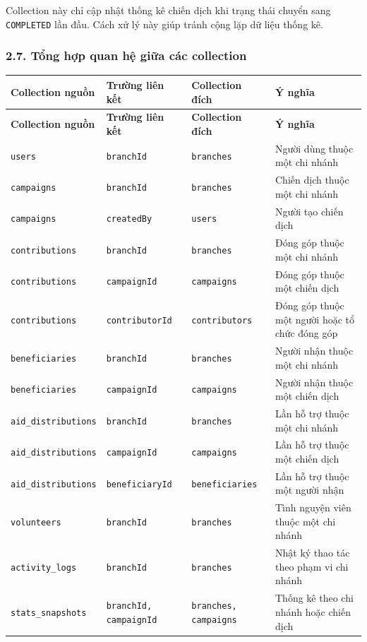 \documentclass[12pt,a4paper]{article}
\begin{document}
Collection này chỉ cập nhật thống kê chiến dịch khi trạng thái chuyển sang \texttt{COMPLETED} lần đầu. Cách xử lý này giúp tránh cộng lặp dữ liệu thống kê.

\subsubsection*{2.7. Tổng hợp quan hệ giữa các collection}

\begin{center}
\small
\begin{longtable}{|p{3.3cm}|p{2.6cm}|p{2.9cm}|p{4cm}|}
\hline
\textbf{Collection nguồn} & \textbf{Trường liên kết} & \textbf{Collection đích} & \textbf{Ý nghĩa} \\ \hline
\endfirsthead
\hline
\textbf{Collection nguồn} & \textbf{Trường liên kết} & \textbf{Collection đích} & \textbf{Ý nghĩa} \\ \hline
\endhead
\texttt{users} & \texttt{branchId} & \texttt{branches} & Người dùng thuộc một chi nhánh \\ \hline
\texttt{campaigns} & \texttt{branchId} & \texttt{branches} & Chiến dịch thuộc một chi nhánh \\ \hline
\texttt{campaigns} & \texttt{createdBy} & \texttt{users} & Người tạo chiến dịch \\ \hline
\texttt{contributions} & \texttt{branchId} & \texttt{branches} & Đóng góp thuộc một chi nhánh \\ \hline
\texttt{contributions} & \texttt{campaignId} & \texttt{campaigns} & Đóng góp thuộc một chiến dịch \\ \hline
\texttt{contributions} & \texttt{contributorId} & \texttt{contributors} & Đóng góp thuộc một người hoặc tổ chức đóng góp \\ \hline
\texttt{beneficiaries} & \texttt{branchId} & \texttt{branches} & Người nhận thuộc một chi nhánh \\ \hline
\texttt{beneficiaries} & \texttt{campaignId} & \texttt{campaigns} & Người nhận thuộc một chiến dịch \\ \hline
\texttt{aid\_distributions} & \texttt{branchId} & \texttt{branches} & Lần hỗ trợ thuộc một chi nhánh \\ \hline
\texttt{aid\_distributions} & \texttt{campaignId} & \texttt{campaigns} & Lần hỗ trợ thuộc một chiến dịch \\ \hline
\texttt{aid\_distributions} & \texttt{beneficiaryId} & \texttt{beneficiaries} & Lần hỗ trợ thuộc một người nhận \\ \hline
\texttt{volunteers} & \texttt{branchId} & \texttt{branches} & Tình nguyện viên thuộc một chi nhánh \\ \hline
\texttt{activity\_logs} & \texttt{branchId} & \texttt{branches} & Nhật ký thao tác theo phạm vi chi nhánh \\ \hline
\texttt{stats\_snapshots} & \texttt{branchId, campaignId} & \texttt{branches, campaigns} & Thống kê theo chi nhánh hoặc chiến dịch \\ \hline
\end{longtable}
\normalsize
\end{center}
\end{document}
